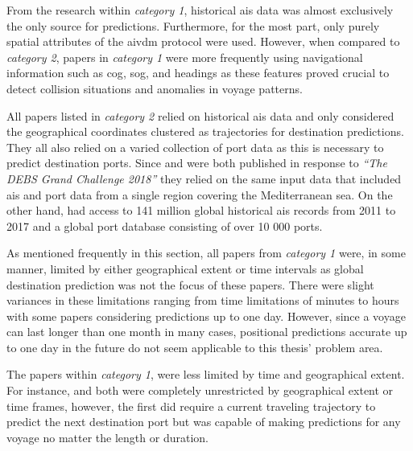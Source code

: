 
From the research within \textit{category 1}, historical \acrshort{ais} data was almost exclusively the only source for predictions. Furthermore, for the most part, only purely spatial attributes of the \gls{aivdm} protocol were used. However, when compared to \textit{category 2}, papers in \textit{category 1} were more frequently using navigational information such as \acrshort{cog}, \acrshort{sog}, and headings as these features proved crucial to detect collision situations and anomalies in voyage patterns.

All papers listed in \textit{category 2} relied on historical \acrshort{ais} data and only considered the geographical coordinates clustered as trajectories for destination predictions. They all also relied on a varied collection of port data as this is necessary to predict destination ports. Since \cite{Rosca2018GrandRoutes} and \cite{Bachar2018GrandDestination} were both published in response to \textit{``The DEBS Grand Challenge 2018''} they relied on the same input data that included \acrshort{ais} and port data from a single region covering the Mediterranean sea. On the other hand, \cite{Zhang2020AISApproach} had access to 141 million global historical \acrshort{ais} records from 2011 to 2017 and a global port database consisting of over 10 000 ports.


As mentioned frequently in this section, all papers from \textit{category 1} were, in some manner, limited by either geographical extent or time intervals as global destination prediction was not the focus of these papers. There were slight variances in these limitations ranging from time limitations of minutes to hours with some papers considering predictions up to one day. However, since a voyage can last longer than one month in many cases, positional predictions accurate up to one day in the future do not seem applicable to this thesis' problem area.

The papers within \textit{category 1}, were less limited by time and geographical extent. For instance, \cite{Zhang2020AISApproach} and \cite{lechtenberg2019} both were completely unrestricted by geographical extent or time frames, however, the first did require a current traveling trajectory to predict the next destination port but was capable of making predictions for any voyage no matter the length or duration.

